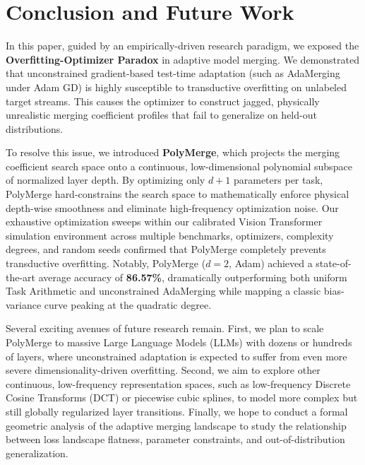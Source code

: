 \section{Conclusion and Future Work}
\label{sec:conclusion}

In this paper, guided by an empirically-driven research paradigm, we exposed the \textbf{Overfitting-Optimizer Paradox} in adaptive model merging. We demonstrated that unconstrained gradient-based test-time adaptation (such as AdaMerging under Adam GD) is highly susceptible to transductive overfitting on unlabeled target streams. This causes the optimizer to construct jagged, physically unrealistic merging coefficient profiles that fail to generalize on held-out distributions. 

To resolve this issue, we introduced \textbf{PolyMerge}, which projects the merging coefficient search space onto a continuous, low-dimensional polynomial subspace of normalized layer depth. By optimizing only $d+1$ parameters per task, PolyMerge hard-constrains the search space to mathematically enforce physical depth-wise smoothness and eliminate high-frequency optimization noise. Our exhaustive optimization sweeps within our calibrated Vision Transformer simulation environment across multiple benchmarks, optimizers, complexity degrees, and random seeds confirmed that PolyMerge completely prevents transductive overfitting. Notably, PolyMerge ($d=2$, Adam) achieved a state-of-the-art average accuracy of \textbf{86.57\%}, dramatically outperforming both uniform Task Arithmetic and unconstrained AdaMerging while mapping a classic bias-variance curve peaking at the quadratic degree.

Several exciting avenues of future research remain. First, we plan to scale PolyMerge to massive Large Language Models (LLMs) with dozens or hundreds of layers, where unconstrained adaptation is expected to suffer from even more severe dimensionality-driven overfitting. Second, we aim to explore other continuous, low-frequency representation spaces, such as low-frequency Discrete Cosine Transforms (DCT) or piecewise cubic splines, to model more complex but still globally regularized layer transitions. Finally, we hope to conduct a formal geometric analysis of the adaptive merging landscape to study the relationship between loss landscape flatness, parameter constraints, and out-of-distribution generalization.

